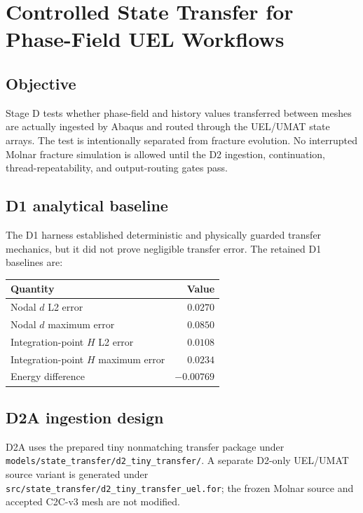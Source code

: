 \chapter{Controlled State Transfer for Phase-Field UEL Workflows}
\label{ch:stage-d-state-transfer}

\section{Objective}
Stage D tests whether phase-field and history values transferred between meshes
are actually ingested by Abaqus and routed through the UEL/UMAT state arrays.
The test is intentionally separated from fracture evolution. No interrupted
Molnar fracture simulation is allowed until the D2 ingestion, continuation,
thread-repeatability, and output-routing gates pass.

\section{D1 analytical baseline}
The D1 harness established deterministic and physically guarded transfer
mechanics, but it did not prove negligible transfer error. The retained D1
baselines are:

\begin{table}[h]
\centering
\begin{tabular}{@{}lr@{}}
\toprule
Quantity & Value \\
\midrule
Nodal $d$ L2 error & $0.0270$ \\
Nodal $d$ maximum error & $0.0850$ \\
Integration-point $H$ L2 error & $0.0108$ \\
Integration-point $H$ maximum error & $0.0234$ \\
Energy difference & $-0.00769$ \\
\bottomrule
\end{tabular}
\end{table}

\section{D2A ingestion design}
D2A uses the prepared tiny nonmatching transfer package under
\texttt{models/state\_transfer/d2\_tiny\_transfer/}. A separate D2-only
UEL/UMAT source variant is generated under
\texttt{src/state\_transfer/d2\_tiny\_transfer\_uel.for}; the frozen Molnar
source and accepted C2C-v3 mesh are not modified.

